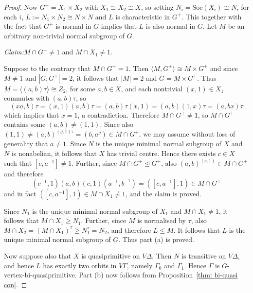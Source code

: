 \documentclass[11pt]{amsart}
\newcommand{\Soc}{\mathrm{Soc}}
\begin{document}
\begin{proof}
    Now $G^+ = X_1\times X_2$ with $X_1\cong X_2\cong X$, so setting $N_i=\Soc(X_i)\cong N$, for each $i$,  \(L:= N_1 \times N_2\cong N\times N\) and $L$ is characteristic in \(G^+\). This together with the fact that \(G^+\) is normal in \(G\) implies that \(L\) is also normal in \(G\). Let \(M\) be an arbitrary non-trivial normal subgroup of \(G\). 
    
    \medskip\noindent
    \textit{Claim:}\quad \(M\cap G^+\neq 1\) and \(M\cap X_1\neq 1\).
    
    \smallskip
    Suppose to the contrary that \(M\cap G^+=1\). Then $\langle M, G^+\rangle \cong M\times G^+$ and since \(M\neq 1\) and \(|G:G^+|=2\), it follows that $|M|=2$ and $G=M\times G^+$. Thus  \(M=\langle (a,b)\tau\rangle\cong Z_2\), for some \(a,b\in X\), and each nontrivial $(x,1)\in X_1$ commutes with $(a,b)\tau$, so 
    \[
    (xa, b)\tau = (x,1)(a,b)\tau = (a,b)\tau (x,1) = (a,b)(1,x)\tau = (a,bx)\tau
    \]
    which implies that $x=1$, a contradiction. Therefore \(M\cap G^+\neq 1\), so $M\cap G^+$ contains some \((a,b)\neq (1,1)\). Since also \((1,1)\neq (a,b)^{(g,1)\tau}=(b,a^g)\in M\cap G^+\), we may assume without loss of generality that \(a\neq1\). 
    Since \(N\) is the unique minimal normal subgroup of \(X\) and \(N\) is nonabelian, it follows that $X$ has trivial centre. Hence there exists \(c\in X\) such that \([c,a^{-1}]\neq 1\). Further, since \(M\cap G^+ \unlhd G^+\), also \((a,b)^{(c,1)}\in M\cap G^+\) and therefore
    \[
    (c^{-1},1)(a,b)(c,1)(a^{-1},b^{-1})=([c,a^{-1}],1)\in M\cap G^+
    \]
    and in fact \(([c,a^{-1}],1)\in M\cap X_1\neq 1\),  and the claim is proved.

\smallskip
    
      Since \(N_1\) is the unique minimal normal subgroup of \(X_1\) and \(M\cap X_1\neq 1\), it follows that \(M\cap X_1\geqslant N_1\). Further, since \(M\) is normalised by \(\tau\), also  \(M\cap X_2 = (M\cap X_1)^{\tau}\geqslant N_1^\tau =  N_2\), and therefore \(L\leqslant M\). It follows that \(L\) is the unique minimal normal subgroup of \(G\). Thus part (a) is proved.

      Now suppose also that $X$ is quasiprimitive on $V\Delta$. Then $N$ is transitive on $V\Delta$, and hence $L$ has exactly two orbits in $V\Gamma$, namely $\Gamma_0$ and $\Gamma_1$. Hence \(\Gamma\) is $G$-vertex-bi-quasiprimitive. Part (b) now follows from Proposition~\ref{thm: bi-quasi con}.
\end{proof}
\end{document}
